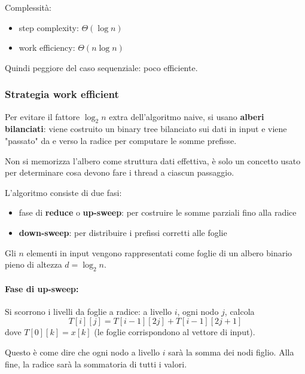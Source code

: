 Complessità: 
\begin{itemize}
    \item step complexity: $\Theta (\log n)$
    \item work efficiency: $\Theta (n \log n)$
\end{itemize}

Quindi peggiore del caso sequenziale: poco efficiente.

\subsubsection{Strategia work efficient}

Per evitare il fattore $\log_2 n$ extra dell'algoritmo naive, si usano \textbf{alberi bilanciati}: viene costruito un binary tree bilanciato sui dati in input e viene "passato" da e verso la radice per computare le somme prefisse.


Non si memorizza l'albero come struttura dati effettiva, è solo un concetto usato per determinare cosa devono fare i thread a ciascun passaggio. 

L'algoritmo consiste di due fasi:
\begin{itemize}
    \item fase di \textbf{reduce} o \textbf{up-sweep}: per costruire le somme parziali fino alla radice
    
    \item \textbf{down-sweep}: per distribuire i prefissi corretti alle foglie
\end{itemize}

Gli $n$ elementi in input vengono rappresentati come foglie di un albero binario pieno di altezza $d = \log_2 n$.

\paragraph{Fase di up-sweep:} Si scorrono i livelli da foglie a radice: a livello $i$, ogni nodo $j$, calcola
$$ T[i][j] = T[i-1][2j] + T[i-1][2j + 1] $$
dove $T[0][k] = x[k]$ (le foglie corrispondono al vettore di input). 

Questo è come dire che ogni nodo a livello $i$ sarà la somma dei nodi figlio. Alla fine, la radice sarà la sommatoria di tutti i valori.

\begin{center}
    
\end{center}

